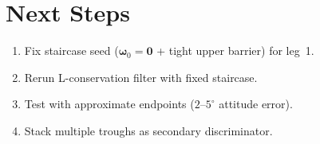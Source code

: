 \documentclass[11pt,a4paper]{article}
\begin{document}
\section{Next Steps}

\begin{enumerate}[nosep]
  \item Fix staircase seed ($\boldsymbol{\omega}_0 = \mathbf{0}$ + tight upper barrier) for leg~1.
  \item Rerun L-conservation filter with fixed staircase.
  \item Test with approximate endpoints ($2$--$5^\circ$ attitude error).
  \item Stack multiple troughs as secondary discriminator.
\end{enumerate}
\end{document}
